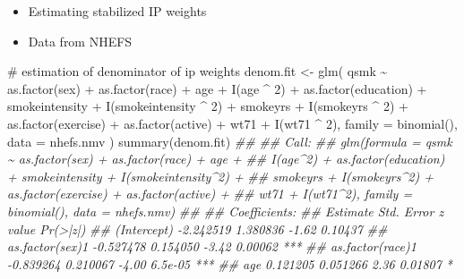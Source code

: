 \documentclass[
  10pt,
  a4paper,
]{book}
\newenvironment{Shaded}{\begin{snugshade}}{\end{snugshade}}
\newcommand{\AttributeTok}[1]{\textcolor[rgb]{0.40,0.45,0.13}{#1}}
\newcommand{\CommentTok}[1]{\textcolor[rgb]{0.37,0.37,0.37}{#1}}
\newcommand{\DecValTok}[1]{\textcolor[rgb]{0.68,0.00,0.00}{#1}}
\newcommand{\DocumentationTok}[1]{\textcolor[rgb]{0.37,0.37,0.37}{\textit{#1}}}
\newcommand{\FunctionTok}[1]{\textcolor[rgb]{0.28,0.35,0.67}{#1}}
\newcommand{\NormalTok}[1]{\textcolor[rgb]{0.00,0.46,0.62}{#1}}
\newcommand{\OtherTok}[1]{\textcolor[rgb]{0.00,0.46,0.62}{#1}}
\newcommand{\SpecialCharTok}[1]{\textcolor[rgb]{0.37,0.37,0.37}{#1}}
\providecommand{\tightlist}{%
  \setlength{\itemsep}{0pt}\setlength{\parskip}{0pt}}
\begin{document}
\begin{itemize}
\tightlist
\item
  Estimating stabilized IP weights
\item
  Data from NHEFS
\end{itemize}

\begin{Shaded}
\begin{Highlighting}[]
\CommentTok{\# estimation of denominator of ip weights}
\NormalTok{denom.fit }\OtherTok{\textless{}{-}}
  \FunctionTok{glm}\NormalTok{(}
\NormalTok{    qsmk }\SpecialCharTok{\textasciitilde{}} \FunctionTok{as.factor}\NormalTok{(sex) }\SpecialCharTok{+} \FunctionTok{as.factor}\NormalTok{(race) }\SpecialCharTok{+}\NormalTok{ age }\SpecialCharTok{+} \FunctionTok{I}\NormalTok{(age }\SpecialCharTok{\^{}} \DecValTok{2}\NormalTok{) }\SpecialCharTok{+}
      \FunctionTok{as.factor}\NormalTok{(education) }\SpecialCharTok{+}\NormalTok{ smokeintensity }\SpecialCharTok{+}
      \FunctionTok{I}\NormalTok{(smokeintensity }\SpecialCharTok{\^{}} \DecValTok{2}\NormalTok{) }\SpecialCharTok{+}\NormalTok{ smokeyrs }\SpecialCharTok{+} \FunctionTok{I}\NormalTok{(smokeyrs }\SpecialCharTok{\^{}} \DecValTok{2}\NormalTok{) }\SpecialCharTok{+}
      \FunctionTok{as.factor}\NormalTok{(exercise) }\SpecialCharTok{+} \FunctionTok{as.factor}\NormalTok{(active) }\SpecialCharTok{+}\NormalTok{ wt71 }\SpecialCharTok{+} \FunctionTok{I}\NormalTok{(wt71 }\SpecialCharTok{\^{}} \DecValTok{2}\NormalTok{),}
    \AttributeTok{family =} \FunctionTok{binomial}\NormalTok{(),}
    \AttributeTok{data =}\NormalTok{ nhefs.nmv}
\NormalTok{  )}
\FunctionTok{summary}\NormalTok{(denom.fit)}
\DocumentationTok{\#\# }
\DocumentationTok{\#\# Call:}
\DocumentationTok{\#\# glm(formula = qsmk \textasciitilde{} as.factor(sex) + as.factor(race) + age + }
\DocumentationTok{\#\#     I(age\^{}2) + as.factor(education) + smokeintensity + I(smokeintensity\^{}2) + }
\DocumentationTok{\#\#     smokeyrs + I(smokeyrs\^{}2) + as.factor(exercise) + as.factor(active) + }
\DocumentationTok{\#\#     wt71 + I(wt71\^{}2), family = binomial(), data = nhefs.nmv)}
\DocumentationTok{\#\# }
\DocumentationTok{\#\# Coefficients:}
\DocumentationTok{\#\#                        Estimate Std. Error z value Pr(\textgreater{}|z|)    }
\DocumentationTok{\#\# (Intercept)           {-}2.242519   1.380836   {-}1.62  0.10437    }
\DocumentationTok{\#\# as.factor(sex)1       {-}0.527478   0.154050   {-}3.42  0.00062 ***}
\DocumentationTok{\#\# as.factor(race)1      {-}0.839264   0.210067   {-}4.00  6.5e{-}05 ***}
\DocumentationTok{\#\# age                    0.121205   0.051266    2.36  0.01807 *  }

\end{Highlighting}
\end{Shaded}
\end{document}
